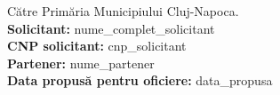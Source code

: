 \documentclass[11pt]{article}
\begin{document}
Către Primăria Municipiului Cluj-Napoca.\\[0.3cm]
\textbf{Solicitant:} {{nume_complet_solicitant}}\\
\textbf{CNP solicitant:} {{cnp_solicitant}}\\
\textbf{Partener:} {{nume_partener}}\\
\textbf{Data propusă pentru oficiere:} {{data_propusa}}
\signatureblock
\end{document}
